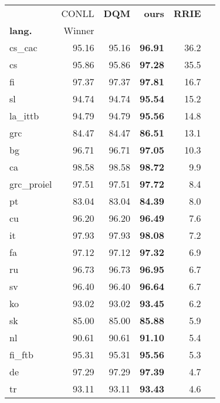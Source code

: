 \documentclass[11pt,a4paper]{article}
\begin{document}
\begin{table}[]
\begin{center}
\small
\renewcommand{\arraystretch}{.95}
\begin{tabular}{|l|r||r|r|r|r|}
\hline 
            &    CONLL    & \bf{DQM}   & \bf ours   &\bf RRIE \\
\bf lang.   &    Winner   &            &            &         \\ \hline
cs\_cac     &      95.16  &     95.16  & \bf 96.91  &     36.2\\
cs          &      95.86  &     95.86  & \bf 97.28  &     35.5\\
fi          &      97.37  &     97.37  & \bf 97.81  &     16.7\\
sl          &      94.74  &     94.74  & \bf 95.54  &     15.2\\
la\_ittb    &      94.79  &     94.79  & \bf 95.56  &     14.8\\
grc         &      84.47  &     84.47  & \bf 86.51  &     13.1\\
bg          &      96.71  &     96.71  & \bf 97.05  &     10.3\\
ca          &      98.58  &     98.58  & \bf 98.72  &      9.9\\
grc\_proiel &      97.51  &     97.51  & \bf 97.72  &      8.4\\
pt          &      83.04  &     83.04  & \bf 84.39  &      8.0\\
cu          &      96.20  &     96.20  & \bf 96.49  &      7.6\\
it          &      97.93  &     97.93  & \bf 98.08  &      7.2\\
fa          &      97.12  &     97.12  & \bf 97.32  &      6.9\\
ru          &      96.73  &     96.73  & \bf 96.95  &      6.7\\
sv          &      96.40  &     96.40  & \bf 96.64  &      6.7\\
ko          &      93.02  &     93.02  & \bf 93.45  &      6.2\\
sk          &      85.00  &     85.00  & \bf 85.88  &      5.9\\
nl          &      90.61  &     90.61  & \bf 91.10  &      5.4\\
fi\_ftb     &      95.31  &     95.31  & \bf 95.56  &      5.3\\
de          &      97.29  &     97.29  & \bf 97.39  &      4.7\\
tr          &      93.11  &     93.11  & \bf 93.43  &      4.6\\

\end{tabular}
\end{center}
\end{table}
\end{document}
